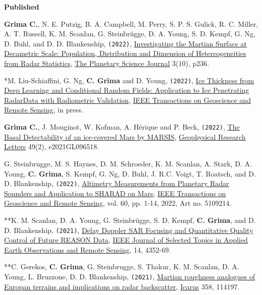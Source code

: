 \textbf{Published}
\begin{etaremune}
\def\labelenumi{\arabic{enumi}.}

\item
  \textbf{Grima C.}, N. E. Putzig, B. A. Campbell, M. Perry, S. P. S. Gulick, R. C. Miller, A. T. Russell, K. M. Scanlan, G. Steinbrügge, D. A. Young, S. D. Kempf, G. Ng, D. Buhl, and D. D. Blankenship, \texttt{(2022)}, \href{https://doi.org/10.3847/PSJ/ac9277}{Investigating the Martian Surface at Decametric Scale: Population, Distribution and Dimension of Hetereogeneities from Radar Statistics}, \ul{The Planetary Science Journal} 3(10), p236.
\item
  *M. Liu-Schiaffini, G. Ng, \textbf{C. Grima} and D. Young, \texttt{(2022)}, \href{https://ieeexplore.ieee.org/document/9916288}{Ice Thickness from Deep Learning and Conditional Random Fields: Application to Ice Penetrating RadarData with Radiometric Validation}, \ul{IEEE Transactions on Geoscience and Remote Sensing}, in press.
\item
  \textbf{Grima C.}, J. Mouginot, W. Kofman, A. Hérique and P. Beck, \texttt{(2022)}, \href{https://doi.org/10.1029/2021GL096518}{The Basal Detectability of an ice-covered Mars by MARSIS}, \ul{Geophysical Research Letters} 49(2), e2021GL096518.
\item
  G. Steinbrugge, M. S. Haynes, D. M. Schroeder, K. M. Scanlan, A. Stark, D. A. Young, \textbf{C. Grima}, S. Kempf, G. Ng, D. Buhl, J. R.C. Voigt, T. Roatsch, and D. D. Blankenship, \texttt{(2022)}, \href{https://doi.org/10.1109/TGRS.2021.3134638}{Altimetry Measurements from Planetary Radar Sounders and Application to SHARAD on Mars}, \ul{IEEE Transactions on Geoscience and Remote Sensing}, vol. 60, pp. 1-14, 2022, Art no. 5109214.
\item
  **K. M. Scanlan, D. A. Young, G. Steinbrügge, S. D. Kempf, \textbf{C. Grima}, and D. D. Blankenship, \texttt{(2021)}, \href{https://ieeexplore.ieee.org/document/9399772?source=authoralert}{Delay Doppler SAR Focusing and Quantitative Quality Control of Future REASON Data}, \ul{IEEE Journal of Selected Topics in Applied Earth Observations and Remote Sensing}, 14, 4352-69.
\item
  **C. Gerekos, \textbf{C. Grima}, G. Steinbrugge, S. Thakur, K. M. Scanlan, D. A. Young, L. Bruzzone, D. D. Blankenship, \texttt{(2021)}, \href{https://doi.org/10.1016/j.icarus.2020.114197}{Martian roughness analogues of Europan terrains and implications on radar backscatter}, \ul{Icarus} 358, 114197.
\item

\end{etaremune}
